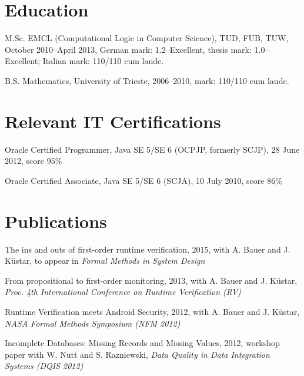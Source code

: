 \documentclass[letterpaper]{article}
\renewenvironment{itemize}{
  \begin{list}{}{
    \setlength{\leftmargin}{1.5em}
  }
}{
  \end{list}
}
\begin{document}
\section*{Education}
\begin{itemize}
  \item M.Sc. EMCL (Computational Logic in Computer Science), TUD, FUB, TUW, October 2010--April 2013, German mark: 1.2--Excellent, thesis mark: 1.0--Excellent; Italian mark: 110/110 cum laude.

  \item B.S. Mathematics, University of Trieste, 2006--2010, mark: 110/110 cum laude. 
\end{itemize}

\section*{Relevant IT Certifications}
\begin{itemize}
\item Oracle Certified Programmer, Java SE 5/SE 6 (OCPJP, formerly SCJP), 28 June 2012, score 95\%
\item Oracle Certified Associate, Java SE 5/SE 6 (SCJA), 10 July 2010, score 86\%
\end{itemize}

\section*{Publications}
\begin{itemize}
\item The ins and outs of first-order runtime verification, 2015, with A. Bauer and J. K\"{u}star, to appear in {\it Formal Methods in System Design}

\item From propositional to first-order monitoring, 2013, with A. Bauer and J. K\"{u}star, {\it Proc. 4th International Conference on Runtime Verification (RV)}

\item Runtime Verification meets Android Security, 2012, with A. Bauer and J. K\"{u}star, {\it NASA Formal Methods Symposium (NFM 2012)}

\item Incomplete Databases: Missing Records and Missing Values, 2012, workshop paper with W. Nutt and S. Razniewski, {\it Data Quality in Data Integration Systems (DQIS 2012)}
\end{itemize}

\iffalse
\end{document}
